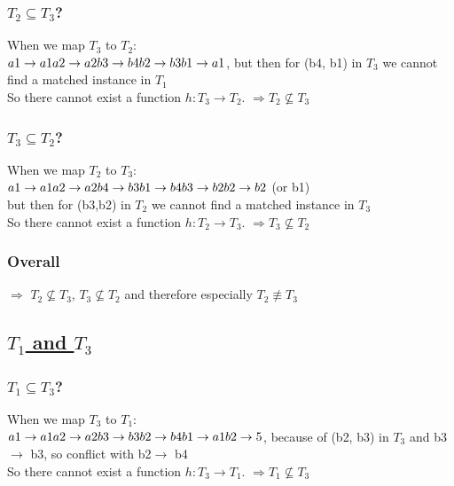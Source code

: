 \documentclass[12pt]{article}
\begin{document}
	\subsubsection*{$T_2 \subseteq T_3$?}
	When we map $T_3$ to $T_2$:\\
	$a1\rightarrow a1\\
	a2\rightarrow a2\\
	b3\rightarrow b4\\
	b2\rightarrow b3\\
	b1\rightarrow a1$, but then for (b4, b1) in $T_3$ we cannot find a matched instance in $T_1$\\
	So there cannot exist a function $h: T_3 \rightarrow T_2$. $\Rightarrow T_2 \not\subseteq T_3$	
	
	\subsubsection*{$T_3 \subseteq T_2$?}	
	When we map $T_2$ to $T_3$:\\
	$a1\rightarrow a1\\
	a2\rightarrow a2\\
	b4\rightarrow b3\\
	b1\rightarrow b4\\
	b3\rightarrow b2\\
	b2\rightarrow b2$ (or b1)\\
	but then for (b3,b2) in $T_2$ we cannot find a matched instance in $T_3$\\
	So there cannot exist a function $h: T_2 \rightarrow T_3$. $\Rightarrow T_3 \not\subseteq T_2$
	\subsubsection*{Overall}
	$\Rightarrow$ $T_2\not\subseteq T_3$, $T_3 \not\subseteq T_2$ and therefore especially $T_2 \not\equiv T_3$ 

	\subsection*{\underline{$T_1$ and $T_3$}}
	\subsubsection*{$T_1 \subseteq T_3$?}
	When we map $T_3$ to $T_1$:\\
	$a1\rightarrow a1\\
	a2\rightarrow a2\\
	b3\rightarrow b3\\
	b2\rightarrow b4\\
	b1\rightarrow a1\\
	b2\rightarrow 5$, because of (b2, b3) in $T_3$ and b3$\rightarrow$ b3, so conflict with b2$\rightarrow$ b4 \\
	So there cannot exist a function $h: T_3 \rightarrow T_1$. $\Rightarrow T_1 \not\subseteq T_3$
\end{document}
